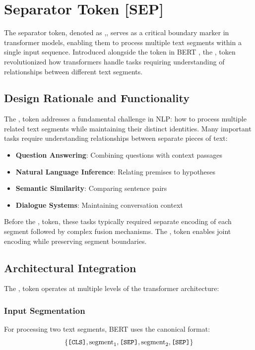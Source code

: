 \section{Separator Token [SEP]}

The separator token, denoted as \sep{}, serves as a critical boundary marker in transformer models, enabling them to process multiple text segments within a single input sequence. Introduced alongside the \cls{} token in BERT \citep{devlin2018bert}, the \sep{} token revolutionized how transformers handle tasks requiring understanding of relationships between different text segments.

\subsection{Design Rationale and Functionality}

The \sep{} token addresses a fundamental challenge in NLP: how to process multiple related text segments while maintaining their distinct identities. Many important tasks require understanding relationships between separate pieces of text:

\begin{itemize}
\item \textbf{Question Answering}: Combining questions with context passages
\item \textbf{Natural Language Inference}: Relating premises to hypotheses  
\item \textbf{Semantic Similarity}: Comparing sentence pairs
\item \textbf{Dialogue Systems}: Maintaining conversation context
\end{itemize}

Before the \sep{} token, these tasks typically required separate encoding of each segment followed by complex fusion mechanisms. The \sep{} token enables joint encoding while preserving segment boundaries.

\subsection{Architectural Integration}

The \sep{} token operates at multiple levels of the transformer architecture:

\subsubsection{Input Segmentation}
For processing two text segments, BERT uses the canonical format:
$$\{\texttt{[CLS]}{}, \text{segment}_1, \texttt{[SEP]}{}, \text{segment}_2, \texttt{[SEP]}{}\}$$

